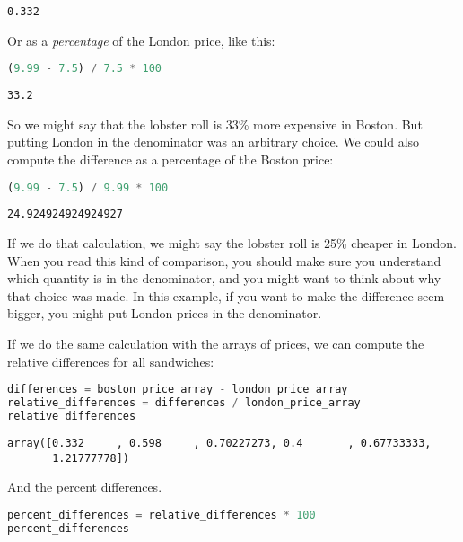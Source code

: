 \begin{lstlisting}[style=output]
0.332
\end{lstlisting}

Or as a \emph{percentage} of the London price, like this:

\begin{lstlisting}[language=Python,style=source]
(9.99 - 7.5) / 7.5 * 100
\end{lstlisting}

\begin{lstlisting}[style=output]
33.2
\end{lstlisting}

So we might say that the lobster roll is 33\% more expensive in Boston.
But putting London in the denominator was an arbitrary choice. We could
also compute the difference as a percentage of the Boston price:

\begin{lstlisting}[language=Python,style=source]
(9.99 - 7.5) / 9.99 * 100
\end{lstlisting}

\begin{lstlisting}[style=output]
24.924924924924927
\end{lstlisting}

If we do that calculation, we might say the lobster roll is 25\% cheaper
in London. When you read this kind of comparison, you should make sure
you understand which quantity is in the denominator, and you might want
to think about why that choice was made. In this example, if you want to
make the difference seem bigger, you might put London prices in the
denominator.

If we do the same calculation with the arrays of prices, we can compute
the relative differences for all sandwiches:

\begin{lstlisting}[language=Python,style=source]
differences = boston_price_array - london_price_array
relative_differences = differences / london_price_array
relative_differences
\end{lstlisting}

\begin{lstlisting}[style=output]
array([0.332     , 0.598     , 0.70227273, 0.4       , 0.67733333,
       1.21777778])
\end{lstlisting}

And the percent differences.

\begin{lstlisting}[language=Python,style=source]
percent_differences = relative_differences * 100
percent_differences
\end{lstlisting}

